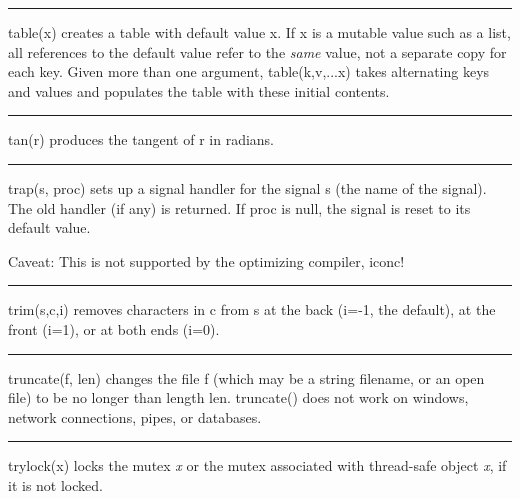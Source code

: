 \bigskip\hrule\vspace{0.1cm}

\noindent
{}\textsf{table(x)} creates a table with default value
\textsf{x}. If \textsf{x} is a mutable value such as a list, all
references to the default value refer to the \textit{same} value, not a
separate copy for each key. Given more than one argument,
\textsf{table(k,v,...x)} takes alternating keys and values and
populates the table with these initial contents.

\bigskip\hrule\vspace{0.1cm}

\noindent
{}\textsf{tan(r)} produces the tangent of \textsf{r} in
radians.

\bigskip\hrule\vspace{0.1cm}

\noindent
{}\textsf{trap(s, proc)} sets up a signal handler for
the signal \textsf{s} (the name of the signal). The old handler (if
any) is returned. If \textsf{proc} is null, the signal is reset to its
default value. 

Caveat: This is not supported by the optimizing
compiler, iconc!

\bigskip\hrule\vspace{0.1cm}

\noindent
{}\textsf{trim(s,c,i)} removes characters in \textsf{c}
from \textsf{s} at the back (\textsf{i}=-1, the default), at the front
(\textsf{i}=1), or at both ends (\textsf{i}=0).

\bigskip\hrule\vspace{0.1cm}

\noindent
{}\textsf{truncate(f, len)} changes the file
\textsf{f} (which may be a string filename, or an open file) to be no
longer than length \textsf{len}. \textsf{truncate()} does not work on
windows, network connections, pipes, or databases.

\bigskip\hrule\vspace{0.1cm}

\noindent
{}\textsf{trylock(x)} locks the mutex {\textit x} or the mutex
associated with thread-safe object {\textit x}, if it is not locked.

